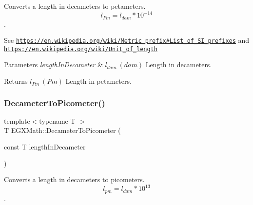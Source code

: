 Converts a length in decameters to petameters. \[ l_{Pm}=l_{dam} * 10^{-14} \]. 

See \href{https://en.wikipedia.org/wiki/Metric_prefix#List_of_SI_prefixes}{\tt https\+://en.\+wikipedia.\+org/wiki/\+Metric\+\_\+prefix\#\+List\+\_\+of\+\_\+\+S\+I\+\_\+prefixes} and \href{https://en.wikipedia.org/wiki/Unit_of_length}{\tt https\+://en.\+wikipedia.\+org/wiki/\+Unit\+\_\+of\+\_\+length} 
\begin{DoxyParams}{Parameters}
{\em length\+In\+Decameter} & $ l_{dam}\ (dam)$ Length in decameters. \\
\hline
\end{DoxyParams}
\begin{DoxyReturn}{Returns}
$ l_{Pm}\ (Pm)$ Length in petameters. 
\end{DoxyReturn}
\mbox{\label{group___e_g_x_math-_conversions-_length_conversions-_decameter-_s_i_gab265bbced03f7b08cf4ad0db29da6dfd}} 
\subsubsection{\texorpdfstring{Decameter\+To\+Picometer()}{DecameterToPicometer()}}
{\footnotesize\ttfamily template$<$typename T $>$ \\
T E\+G\+X\+Math\+::\+Decameter\+To\+Picometer (\begin{DoxyParamCaption}\item[{const T}]{length\+In\+Decameter }\end{DoxyParamCaption})}



Converts a length in decameters to picometers. \[ l_{pm}=l_{dam} * 10^{13} \]. 

